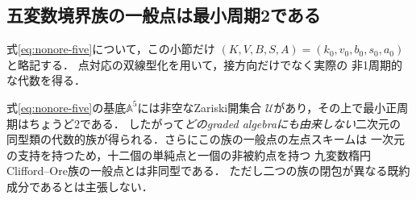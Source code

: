 \subsection{五変数境界族の一般点は最小周期2である}\label{subsec:nonore-period}
式\eqref{eq:nonore-five}について，この小節だけ
$(K,V,B,S,A)=(k_0,v_0,b_0,s_0,a_0)$と略記する．
点対応の双線型化を用いて，接方向だけでなく実際の
非1周期的な代数を得る．

\begin{theorem}[非Ore型五変数族の一般最小周期2]\label{thm:nonore-generic-two}
式\eqref{eq:nonore-five}の基底$\mathbb A^5$には非空なZariski開集合
$\mathcal U$があり，その上で最小正周期はちょうど$2$である．
したがって\emph{どのgraded algebraにも由来しない}二次元の
同型類の代数的族が得られる．さらにこの族の一般点の左点スキームは
一次元の支持を持つため，十二個の単純点と一個の非被約点を持つ
九変数楕円Clifford--Ore族の一般点とは非同型である．
ただし二つの族の閉包が異なる既約成分であるとは主張しない．
\end{theorem}
